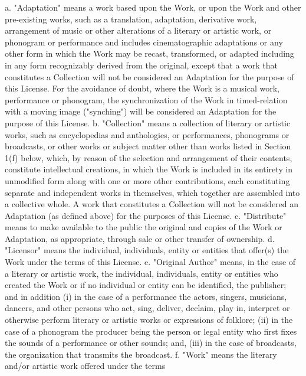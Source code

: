  a. "Adaptation" means a work based upon the Work, or upon the Work and
    other pre-existing works, such as a translation, adaptation,
    derivative work, arrangement of music or other alterations of a
    literary or artistic work, or phonogram or performance and includes
    cinematographic adaptations or any other form in which the Work may be
    recast, transformed, or adapted including in any form recognizably
    derived from the original, except that a work that constitutes a
    Collection will not be considered an Adaptation for the purpose of
    this License. For the avoidance of doubt, where the Work is a musical
    work, performance or phonogram, the synchronization of the Work in
    timed-relation with a moving image ("synching") will be considered an
    Adaptation for the purpose of this License.
 b. "Collection" means a collection of literary or artistic works, such as
    encyclopedias and anthologies, or performances, phonograms or
    broadcasts, or other works or subject matter other than works listed
    in Section 1(f) below, which, by reason of the selection and
    arrangement of their contents, constitute intellectual creations, in
    which the Work is included in its entirety in unmodified form along
    with one or more other contributions, each constituting separate and
    independent works in themselves, which together are assembled into a
    collective whole. A work that constitutes a Collection will not be
    considered an Adaptation (as defined above) for the purposes of this
    License.
 c. "Distribute" means to make available to the public the original and
    copies of the Work or Adaptation, as appropriate, through sale or
    other transfer of ownership.
 d. "Licensor" means the individual, individuals, entity or entities that
    offer(s) the Work under the terms of this License.
 e. "Original Author" means, in the case of a literary or artistic work,
    the individual, individuals, entity or entities who created the Work
    or if no individual or entity can be identified, the publisher; and in
    addition (i) in the case of a performance the actors, singers,
    musicians, dancers, and other persons who act, sing, deliver, declaim,
    play in, interpret or otherwise perform literary or artistic works or
    expressions of folklore; (ii) in the case of a phonogram the producer
    being the person or legal entity who first fixes the sounds of a
    performance or other sounds; and, (iii) in the case of broadcasts, the
    organization that transmits the broadcast.
 f. "Work" means the literary and/or artistic work offered under the terms
